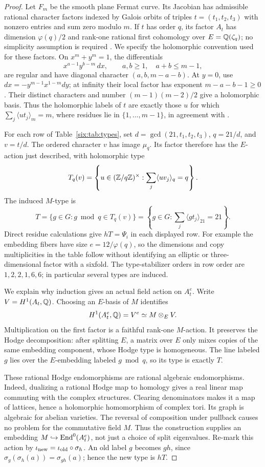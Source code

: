 \begin{proof}
Let $F_m$ be the smooth plane Fermat curve. Its Jacobian has admissible
rational character factors indexed by Galois orbits of triples
$t=(t_1,t_2,t_3)$ with nonzero entries and sum zero modulo $m$.
If $t$ has order $q$, its factor $A_t$ has dimension $\varphi(q)/2$
and rank-one rational first cohomology over $E=\mathbb Q(\zeta_q)$;
no simplicity assumption is required
\cite[\S2, eqs.~(2.2)--(2.4) and Definition~2.1]{Shioda1981}.
We specify the holomorphic convention used for these factors.
On $x^m+y^m=1$, the differentials
\[
 x^{a-1}y^{b-m}\,dx,
 \qquad a,b\geq1,\quad a+b\leq m-1,
\]
are regular and have diagonal character $(a,b,m-a-b)$.
At $y=0$, use $dx=-y^{m-1}x^{1-m}dy$; at infinity their local
factor has exponent $m-a-b-1\geq0$. Their distinct characters and
number $(m-1)(m-2)/2$ give a holomorphic basis. Thus the holomorphic
labels of $t$ are exactly those $u$ for which
$\sum_j\langle ut_j\rangle_m=m$, where residues lie in
$\{1,\ldots,m-1\}$, in agreement with
\cite[eq.~(2.1), p.~68]{Shioda1981}.

For each row of Table~\ref{six:tab:types}, set
$d=\gcd(21,t_1,t_2,t_3)$, $q=21/d$, and $v=t/d$.
The ordered character $v$ has image $\mu_q$. Its factor therefore
has the $E$-action just described, with holomorphic type
\[
 T_q(v)=\left\{u\in(\mathbb Z/q\mathbb Z)^\times:
              \sum_j\langle uv_j\rangle_q=q\right\}.
\]
The induced $M$-type is
\[
 T=\{g\in G:g\bmod q\in T_q(v)\}
   =\left\{g\in G:\sum_j\langle gt_j\rangle_{21}=21\right\}.
\]
Direct residue calculations give $hT=\Psi_i$ in each displayed row.
For example the embedding fibers have size $e=12/\varphi(q)$,
so the dimensions and copy multiplicities in the table follow
without identifying an elliptic or three-dimensional factor with
a sixfold. The type-stabilizer orders in row order are
$1,2,2,1,6,6$; in particular several types are induced.

We explain why induction gives an actual field action on $A_t^e$.
Write $V=H^1(A_t,\mathbb Q)$. Choosing an $E$-basis of $M$ identifies
\[
 H^1(A_t^e,\mathbb Q)=V^e\simeq M\otimes_E V.
\]
Multiplication on the first factor is a faithful rank-one $M$-action.
It preserves the Hodge decomposition: after splitting $E$, a matrix
over $E$ only mixes copies of the same embedding component, whose
Hodge type is homogeneous. The line labeled $g$ lies over the
$E$-embedding labeled $g\bmod q$, so its type is exactly $T$.

These rational Hodge endomorphisms are rational algebraic endomorphisms.
Indeed, dualizing a rational Hodge map to homology gives a real linear
map commuting with the complex structures. Clearing denominators
makes it a map of lattices, hence a holomorphic homomorphism of
complex tori. Its graph is algebraic for abelian varieties.
The reversal of composition under pullback causes no problem for
the commutative field $M$. Thus the construction supplies an embedding
$M\hookrightarrow\operatorname{End}^0(A_t^e)$, not just a choice of split eigenvalues.
Re-mark this action by $\iota_{\rm new}=\iota_{\rm old}\circ\sigma_h$.
An old label $g$ becomes $gh$, since
$\sigma_g(\sigma_h(a))=\sigma_{gh}(a)$; hence the new type is $hT$.


\end{proof}
